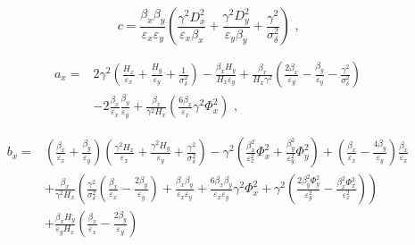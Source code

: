 \begin{equation}
    c = \frac{\beta_x \beta_y}{\varepsilon_x \varepsilon_y} \left( \frac{\gamma^2 D_x^{2}}{\varepsilon_x \beta_x} + \frac{\gamma^2 D_y^{2}}{\varepsilon_y \beta_y} + \frac{\gamma^2}{\sigma_{\delta}^{2}} \right) \text{ ,}
    \label{equation:bm_c}
\end{equation}

\begin{equation}
    \begin{aligned}
    a_x = & 2 \gamma^2 \left(\frac{H_x}{\varepsilon_x} + \frac{H_y}{\varepsilon_y} + \frac{1}{\sigma_{\delta}^{2}}\right) - \frac{\beta_x H_y}{H_x \varepsilon_y} + \frac{\beta_x}{H_x \gamma^2} \left( \frac{2 \beta_x}{\varepsilon_y} - \frac{\beta_y}{\varepsilon_y} - \frac{\gamma^2}{\sigma_{\delta}^{2}} \right) \\
          & - 2 \frac{\beta_x}{\varepsilon_x} \frac{\beta_y}{\varepsilon_y} + \frac{\beta_x}{\gamma^2 H_x} \left( \frac{6 \beta_x}{\varepsilon_x} \gamma^2 \Phi_x^{2} \right) \text{ ,}
    \end{aligned}
    \label{equation:bm_ax}
\end{equation}

\begin{equation}
    \begin{aligned}
        b_x = & \left(\frac{\beta_x}{\varepsilon_x} + \frac{\beta_y}{\varepsilon_y}\right) \left(\frac{\gamma^2 H_x}{\varepsilon_x} + \frac{\gamma^2 H_y}{\varepsilon_y} + \frac{\gamma^2}{\sigma_{\delta}^{2}}\right) - \gamma^2 \left(\frac{\beta_x^{2}}{\varepsilon_x^{2}} \Phi_x^{2} + \frac{\beta_y^{2}}{\varepsilon_y^{2}} \Phi_y^{2}\right) + \left(\frac{\beta_x}{\varepsilon_x} - \frac{4 \beta_y}{\varepsilon_y}\right) \frac{\beta_x}{\varepsilon_x} \\
              & + \frac{\beta_x}{\gamma^2 H_x} \left(\frac{\gamma^2}{\sigma_{\delta}^{2}} \left(\frac{\beta_x}{\varepsilon_x} - \frac{2 \beta_y}{\varepsilon_y} \right) + \frac{\beta_x \beta_y}{\varepsilon_x \varepsilon_y} + \frac{6 \beta_x \beta_y}{\varepsilon_x \varepsilon_y} \gamma^2 \Phi_x^{2} + \gamma^2 \left(\frac{2 \beta_y^{2} \Phi_y^{2}}{\varepsilon_y^{2}} - \frac{\beta_x^{2} \Phi_x^{2}}{\varepsilon_x^{2}}\right)\right) \\
              & + \frac{\beta_x H_y}{\varepsilon_y H_x} \left(\frac{\beta_x}{\varepsilon_x} - \frac{2 \beta_y}{\varepsilon_y}\right)
    \end{aligned}
    \label{equation:bm_bx}
\end{equation}

